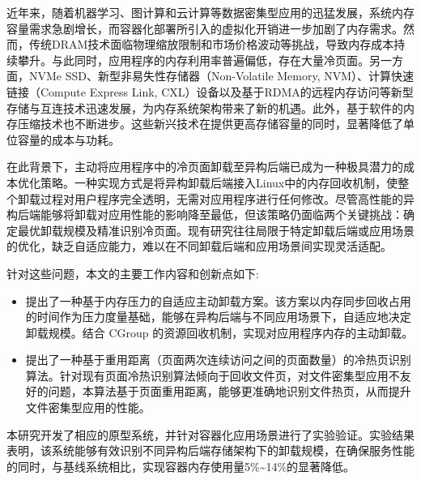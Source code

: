 	
\begin{chineseabstract}

近年来，随着机器学习、图计算和云计算等数据密集型应用的迅猛发展，系统内存容量需求急剧增长，而容器化部署所引入的虚拟化开销进一步加剧了内存需求。然而，传统DRAM技术面临物理缩放限制和市场价格波动等挑战，导致内存成本持续攀升。与此同时，应用程序的内存利用率普遍偏低，存在大量冷页面。另一方面，NVMe SSD、新型非易失性存储器（Non-Volatile Memory, NVM）、计算快速链接（Compute Express Link, CXL）设备以及基于RDMA的远程内存访问等新型存储与互连技术迅速发展，为内存系统架构带来了新的机遇。此外，基于软件的内存压缩技术也不断进步。这些新兴技术在提供更高存储容量的同时，显著降低了单位容量的成本与功耗。

在此背景下，主动将应用程序中的冷页面卸载至异构后端已成为一种极具潜力的成本优化策略。一种实现方式是将异构卸载后端接入Linux中的内存回收机制，使整个卸载过程对用户程序完全透明，无需对应用程序进行任何修改。尽管高性能的异构后端能够将卸载对应用性能的影响降至最低，但该策略仍面临两个关键挑战：确定最优卸载规模及精准识别冷页面。现有研究往往局限于特定卸载后端或应用场景的优化，缺乏自适应能力，难以在不同卸载后端和应用场景间实现灵活适配。

针对这些问题，本文的主要工作内容和创新点如下:
\begin{itemize}
    \item 提出了一种基于内存压力的自适应主动卸载方案。该方案以内存同步回收占用的时间作为压力度量基础，能够在异构后端与不同应用场景下，自适应地决定卸载规模。结合 CGroup 的资源回收机制，实现对应用程序内存的主动卸载。
    \item 提出了一种基于重用距离（页面两次连续访问之间的页面数量）的冷热页识别算法。针对现有页面冷热识别算法倾向于回收文件页，对文件密集型应用不友好的问题，本算法基于页面重用距离，能够更准确地识别文件热页，从而提升文件密集型应用的性能。
\end{itemize}

本研究开发了相应的原型系统，并针对容器化应用场景进行了实验验证。实验结果表明，该系统能够有效识别不同异构后端存储架构下的卸载规模，在确保服务性能的同时，与基线系统相比，实现容器内存使用量5\%\~{}14\%的显著降低。

\end{chineseabstract}